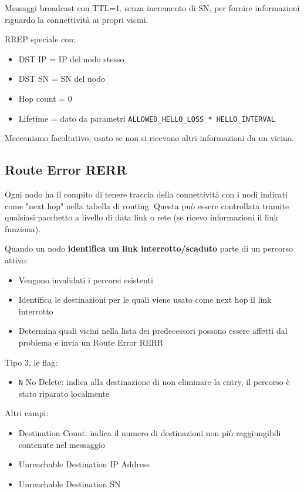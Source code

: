 Messaggi broadcast con TTL=1, senza incremento di SN, per fornire informazioni riguardo la connettività ai propri vicini. 

RREP speciale con:
\begin{itemize}
    \item DST IP = IP del nodo stesso 
    
    \item DST SN = SN del nodo 
    
    \item Hop count = 0 
    
    \item Lifetime = dato da parametri \texttt{ALLOWED\_HELLO\_LOSS * HELLO\_INTERVAL}
\end{itemize}

Meccanismo facoltativo, usato se non si ricevono altri informazioni da un vicino.

\subsection{Route Error RERR}

Ogni nodo ha il compito di tenere traccia della connettività con i nodi indicati come "next hop" nella tabella di routing. Questa può essere controllata tramite qualsiasi pacchetto a livello di data link o rete (se ricevo informazioni il link funziona).

Quando un nodo \textbf{identifica un link interrotto/scaduto} parte di un percorso attivo: 
\begin{itemize}
    \item Vengono invalidati i percorsi esistenti 
    
    \item Identifica le destinazioni per le quali viene usato come next hop il link interrotto
    
    \item Determina quali vicini nella lista dei predecessori possono essere affetti dal problema e invia un Route Error RERR
\end{itemize}

Tipo 3, le flag: 
\begin{itemize}
    \item \texttt{N} No Delete: indica alla destinazione di non eliminare la entry, il percorso è stato riparato localmente
\end{itemize}

Altri campi:
\begin{itemize}
    \item Destination Count: indica il numero di destinazioni non più raggiungibili contenute nel messaggio
    
    \item Unreachable Destination IP Address
    
    \item Unreachable Destination SN
\end{itemize}

